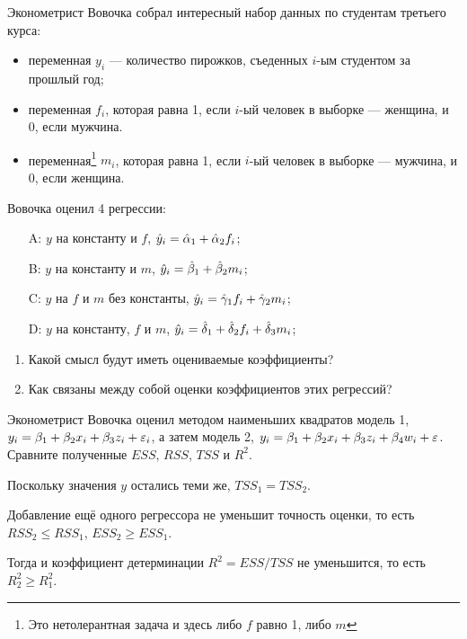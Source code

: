 \begin{problem}

Эконометрист Вовочка собрал интересный набор данных по студентам третьего курса:
\begin{itemize}
\item переменная $y_i$ — количество пирожков, съеденных $i$-ым студентом за прошлый год;
\item переменная $f_i$, которая равна 1, если $i$-ый человек в выборке — женщина, и 0, если мужчина.
\item переменная\footnote{Это нетолерантная задача и здесь либо $f$ равно 1, либо $m$} $m_i$, которая равна 1, если $i$-ый человек в выборке — мужчина, и 0, если женщина.
\end{itemize}

Вовочка оценил 4 регрессии:
\begin{enumerate}
\item[A:] $y$ на константу и $f$, $\hat{y}_i = \hat \alpha_1 + \hat \alpha_2 f_i$;
\item[B:] $y$ на константу и $m$, $\hat{y}_i = \hat{\beta}_1 + \hat{\beta}_2 m_i$;
\item[C:] $y$ на $f$ и $m$ без константы, $\hat{y}_i = \hat \gamma_1 f_i + \hat \gamma_2 m_i$;
\item[D:] $y$ на константу, $f$ и $m$, $\hat{y}_i = \hat \delta_1 + \hat \delta_2 f_i + \hat \delta_3 m_i$;
\end{enumerate}

\begin{enumerate}
\item Какой смысл будут иметь оцениваемые коэффициенты?
\item Как связаны между собой оценки коэффициентов этих регрессий?
\end{enumerate}


\begin{sol}
\end{sol}
\end{problem}


\begin{problem}
Эконометрист Вовочка оценил методом наименьших квадратов модель 1, $y_i=\beta_1+\beta_2 x_i+\beta_3 z_i+\varepsilon_i$,
а затем модель 2, $y_i=\beta_1+\beta_2 x_i+\beta_3 z_i+\beta_4 w_i+\varepsilon$.
Сравните полученные $ESS$, $RSS$, $TSS$ и $R^2$.

\begin{sol}
Поскольку значения $y$ остались теми же, $TSS_1 = TSS_2$.

Добавление ещё одного регрессора не уменьшит точность оценки, то есть
$RSS_2 \leq RSS_1$, $ESS_2 \geq ESS_1$.

Тогда и коэффициент детерминации $R^2 = ESS / TSS$ не уменьшится, то есть
$R^2_2 \geq R^2_1$.
\end{sol}
\end{problem}

